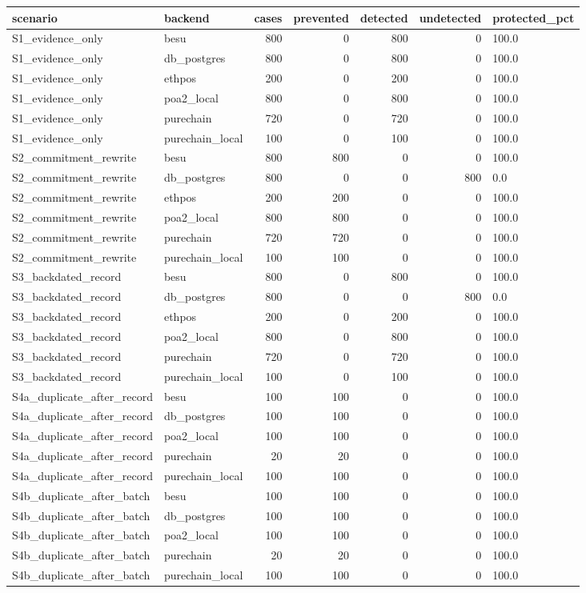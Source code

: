 \begin{tabular}{llrrrrl}
\toprule
scenario & backend & cases & prevented & detected & undetected & protected\_pct \\
\midrule
S1\_evidence\_only & besu & 800 & 0 & 800 & 0 & 100.0 \\
S1\_evidence\_only & db\_postgres & 800 & 0 & 800 & 0 & 100.0 \\
S1\_evidence\_only & ethpos & 200 & 0 & 200 & 0 & 100.0 \\
S1\_evidence\_only & poa2\_local & 800 & 0 & 800 & 0 & 100.0 \\
S1\_evidence\_only & purechain & 720 & 0 & 720 & 0 & 100.0 \\
S1\_evidence\_only & purechain\_local & 100 & 0 & 100 & 0 & 100.0 \\
S2\_commitment\_rewrite & besu & 800 & 800 & 0 & 0 & 100.0 \\
S2\_commitment\_rewrite & db\_postgres & 800 & 0 & 0 & 800 & 0.0 \\
S2\_commitment\_rewrite & ethpos & 200 & 200 & 0 & 0 & 100.0 \\
S2\_commitment\_rewrite & poa2\_local & 800 & 800 & 0 & 0 & 100.0 \\
S2\_commitment\_rewrite & purechain & 720 & 720 & 0 & 0 & 100.0 \\
S2\_commitment\_rewrite & purechain\_local & 100 & 100 & 0 & 0 & 100.0 \\
S3\_backdated\_record & besu & 800 & 0 & 800 & 0 & 100.0 \\
S3\_backdated\_record & db\_postgres & 800 & 0 & 0 & 800 & 0.0 \\
S3\_backdated\_record & ethpos & 200 & 0 & 200 & 0 & 100.0 \\
S3\_backdated\_record & poa2\_local & 800 & 0 & 800 & 0 & 100.0 \\
S3\_backdated\_record & purechain & 720 & 0 & 720 & 0 & 100.0 \\
S3\_backdated\_record & purechain\_local & 100 & 0 & 100 & 0 & 100.0 \\
S4a\_duplicate\_after\_record & besu & 100 & 100 & 0 & 0 & 100.0 \\
S4a\_duplicate\_after\_record & db\_postgres & 100 & 100 & 0 & 0 & 100.0 \\
S4a\_duplicate\_after\_record & poa2\_local & 100 & 100 & 0 & 0 & 100.0 \\
S4a\_duplicate\_after\_record & purechain & 20 & 20 & 0 & 0 & 100.0 \\
S4a\_duplicate\_after\_record & purechain\_local & 100 & 100 & 0 & 0 & 100.0 \\
S4b\_duplicate\_after\_batch & besu & 100 & 100 & 0 & 0 & 100.0 \\
S4b\_duplicate\_after\_batch & db\_postgres & 100 & 100 & 0 & 0 & 100.0 \\
S4b\_duplicate\_after\_batch & poa2\_local & 100 & 100 & 0 & 0 & 100.0 \\
S4b\_duplicate\_after\_batch & purechain & 20 & 20 & 0 & 0 & 100.0 \\
S4b\_duplicate\_after\_batch & purechain\_local & 100 & 100 & 0 & 0 & 100.0 \\
\bottomrule
\end{tabular}
